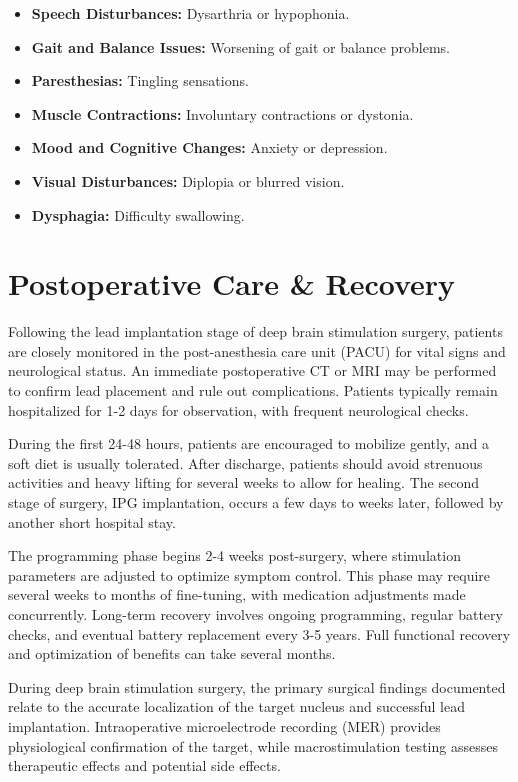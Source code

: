 \begin{itemize}
\begin{itemize}
      \item \textbf{Speech Disturbances:} Dysarthria or hypophonia.
      \item \textbf{Gait and Balance Issues:} Worsening of gait or balance problems.
      \item \textbf{Paresthesias:} Tingling sensations.
      \item \textbf{Muscle Contractions:} Involuntary contractions or dystonia.
      \item \textbf{Mood and Cognitive Changes:} Anxiety or depression.
      \item \textbf{Visual Disturbances:} Diplopia or blurred vision.
      \item \textbf{Dysphagia:} Difficulty swallowing.
    \end{itemize}
\end{itemize}

\section*{Postoperative Care \& Recovery}
Following the lead implantation stage of deep brain stimulation surgery, patients are closely monitored in the post-anesthesia care unit (PACU) for vital signs and neurological status. An immediate postoperative CT or MRI may be performed to confirm lead placement and rule out complications. Patients typically remain hospitalized for 1-2 days for observation, with frequent neurological checks.

During the first 24-48 hours, patients are encouraged to mobilize gently, and a soft diet is usually tolerated. After discharge, patients should avoid strenuous activities and heavy lifting for several weeks to allow for healing. The second stage of surgery, IPG implantation, occurs a few days to weeks later, followed by another short hospital stay.

The programming phase begins 2-4 weeks post-surgery, where stimulation parameters are adjusted to optimize symptom control. This phase may require several weeks to months of fine-tuning, with medication adjustments made concurrently. Long-term recovery involves ongoing programming, regular battery checks, and eventual battery replacement every 3-5 years. Full functional recovery and optimization of benefits can take several months.

During deep brain stimulation surgery, the primary surgical findings documented relate to the accurate localization of the target nucleus and successful lead implantation. Intraoperative microelectrode recording (MER) provides physiological confirmation of the target, while macrostimulation testing assesses therapeutic effects and potential side effects.

